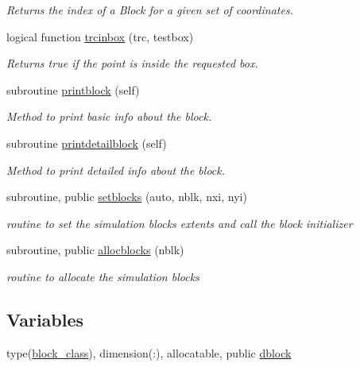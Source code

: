 \begin{DoxyCompactItemize}
\begin{DoxyCompactList}\small\item\em Returns the index of a Block for a given set of coordinates. \end{DoxyCompactList}\item 
logical function \mbox{\hyperlink{namespaceblocks__mod_ad8d92210b3d4ade090d2a19b97f4c88e}{trcinbox}} (trc, testbox)
\begin{DoxyCompactList}\small\item\em Returns true if the point is inside the requested box. \end{DoxyCompactList}\item 
subroutine \mbox{\hyperlink{namespaceblocks__mod_a6eab8b323cb15dcecb5c6b0c31b4e246}{printblock}} (self)
\begin{DoxyCompactList}\small\item\em Method to print basic info about the block. \end{DoxyCompactList}\item 
subroutine \mbox{\hyperlink{namespaceblocks__mod_a10f356706988c45a255922fe70851488}{printdetailblock}} (self)
\begin{DoxyCompactList}\small\item\em Method to print detailed info about the block. \end{DoxyCompactList}\item 
subroutine, public \mbox{\hyperlink{namespaceblocks__mod_a8f5a5d9e6cfd16cfd1b179092a204696}{setblocks}} (auto, nblk, nxi, nyi)
\begin{DoxyCompactList}\small\item\em routine to set the simulation blocks extents and call the block initializer \end{DoxyCompactList}\item 
subroutine, public \mbox{\hyperlink{namespaceblocks__mod_a639beb0fee2290d46353f4b4702d6711}{allocblocks}} (nblk)
\begin{DoxyCompactList}\small\item\em routine to allocate the simulation blocks \end{DoxyCompactList}\end{DoxyCompactItemize}
\subsection*{Variables}
\begin{DoxyCompactItemize}
\item 
type(\mbox{\hyperlink{structblocks__mod_1_1block__class}{block\+\_\+class}}), dimension(\+:), allocatable, public \mbox{\hyperlink{namespaceblocks__mod_ac8ad6e3cf7a812f95dadb592336aca50}{dblock}}
\end{DoxyCompactItemize}



